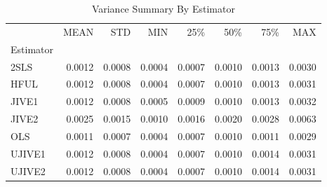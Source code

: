 \begin{table}[ht]
\centering
\caption{Variance Summary By Estimator}
\begin{tabular}{lrrrrrrr}
\toprule
 & MEAN & STD & MIN & 25\% & 50\% & 75\% & MAX \\
Estimator &  &  &  &  &  &  &  \\
\midrule
2SLS & 0.0012 & 0.0008 & 0.0004 & 0.0007 & 0.0010 & 0.0013 & 0.0030 \\
HFUL & 0.0012 & 0.0008 & 0.0004 & 0.0007 & 0.0010 & 0.0013 & 0.0031 \\
JIVE1 & 0.0012 & 0.0008 & 0.0005 & 0.0009 & 0.0010 & 0.0013 & 0.0032 \\
JIVE2 & 0.0025 & 0.0015 & 0.0010 & 0.0016 & 0.0020 & 0.0028 & 0.0063 \\
OLS & 0.0011 & 0.0007 & 0.0004 & 0.0007 & 0.0010 & 0.0011 & 0.0029 \\
UJIVE1 & 0.0012 & 0.0008 & 0.0004 & 0.0007 & 0.0010 & 0.0014 & 0.0031 \\
UJIVE2 & 0.0012 & 0.0008 & 0.0004 & 0.0007 & 0.0010 & 0.0014 & 0.0031 \\
\bottomrule
\end{tabular}
\end{table}
